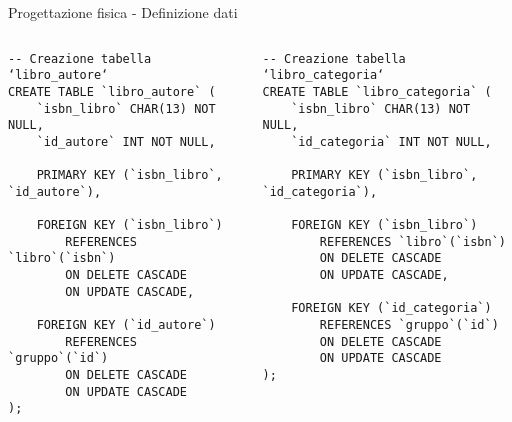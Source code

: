 \begin{frame}[fragile]{Progettazione fisica - Definizione dati}
    \begin{columns}[T]
        \begin{column}[T]{.45\textwidth}
            \begin{verbatim}
-- Creazione tabella ‘libro_autore‘
CREATE TABLE `libro_autore` (
    `isbn_libro` CHAR(13) NOT NULL,
    `id_autore` INT NOT NULL,

    PRIMARY KEY (`isbn_libro`, `id_autore`),
    
    FOREIGN KEY (`isbn_libro`)
        REFERENCES `libro`(`isbn`)
        ON DELETE CASCADE
        ON UPDATE CASCADE,

    FOREIGN KEY (`id_autore`)
        REFERENCES `gruppo`(`id`)
        ON DELETE CASCADE
        ON UPDATE CASCADE
);
            \end{verbatim}
        \end{column}
        \begin{column}[T]{.45\textwidth}
            \begin{verbatim}
-- Creazione tabella ‘libro_categoria‘
CREATE TABLE `libro_categoria` (
    `isbn_libro` CHAR(13) NOT NULL,
    `id_categoria` INT NOT NULL,

    PRIMARY KEY (`isbn_libro`, `id_categoria`),
    
    FOREIGN KEY (`isbn_libro`)
        REFERENCES `libro`(`isbn`)
        ON DELETE CASCADE
        ON UPDATE CASCADE,

    FOREIGN KEY (`id_categoria`)
        REFERENCES `gruppo`(`id`)
        ON DELETE CASCADE
        ON UPDATE CASCADE
);
            \end{verbatim}
        \end{column}
    \end{columns}
\end{frame}


